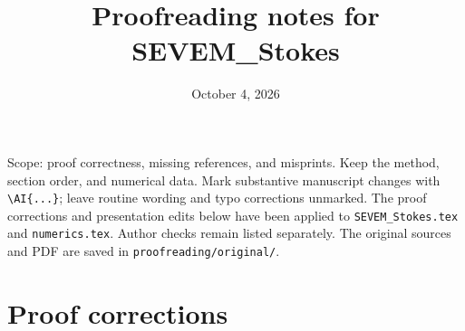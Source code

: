 \documentclass[10pt]{article}
\title{Proofreading notes for SEVEM\_Stokes}
\author{}
\date{October 4, 2026}
\begin{document}
\maketitle
\noindent Scope: proof correctness, missing references, and misprints. Keep the
method, section order, and numerical data. Mark substantive manuscript changes
with \verb|\AI{...}|; leave routine wording and typo corrections unmarked.
The proof corrections and presentation edits below have been applied to
\texttt{SEVEM\_Stokes.tex} and \texttt{numerics.tex}. Author checks remain
listed separately. The original sources and PDF are saved in \texttt{proofreading/original/}.

\section*{Proof corrections}
\end{document}
